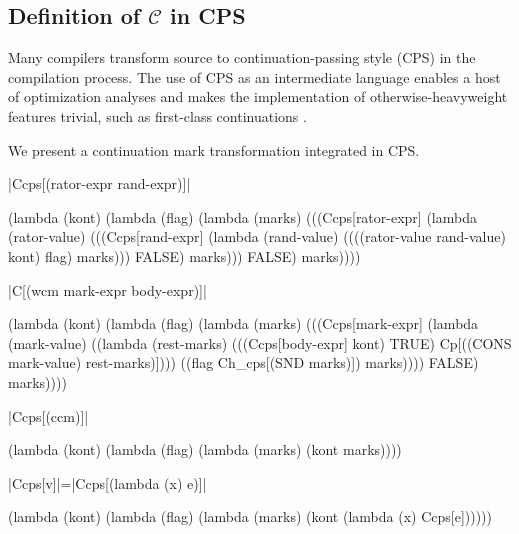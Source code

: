 \documentclass{llncs}
\begin{document}
\subsection{Definition of $\mathcal{C}$ in CPS}

Many compilers transform source to continuation-passing style (CPS) in the compilation process. The use of CPS as an intermediate language enables a host of optimization analyses and makes the implementation of otherwise-heavyweight features trivial, such as first-class continuations \cite{appel2007compiling}.

We present a continuation mark transformation integrated in CPS.

\begin{schemedefn}{\scheme|Ccps[(rator-expr rand-expr)]|}
\begin{schemedisplay}
(lambda (kont)
   (lambda (flag)
     (lambda (marks)
       (((Ccps[rator-expr]
          (lambda (rator-value)
            (((Ccps[rand-expr]
               (lambda (rand-value)
                 ((((rator-value rand-value) kont) flag) marks)))
              FALSE)
             marks)))
         FALSE)
        marks))))
\end{schemedisplay}
\end{schemedefn}

\begin{schemedefn}{\scheme|C[(wcm mark-expr body-expr)]|}
\begin{schemedisplay}
(lambda (kont)
  (lambda (flag)
    (lambda (marks)
      (((Ccps[mark-expr]
          (lambda (mark-value) 
            ((lambda (rest-marks) 
               (((Ccps[body-expr] kont) TRUE) Cp[((CONS mark-value) rest-marks)])))
             ((flag Ch_cps[(SND marks)]) marks))))
        FALSE)
       marks))))
\end{schemedisplay}
\end{schemedefn}

\begin{schemedefn}{\scheme|Ccps[(ccm)]|}
\begin{schemedisplay}
(lambda (kont)
  (lambda (flag)
    (lambda (marks)
      (kont marks))))
\end{schemedisplay}
\end{schemedefn}

\begin{schemedefn}{\scheme|Ccps[v]|=\scheme|Ccps[(lambda (x) e)]|}
\begin{schemedisplay}
(lambda (kont)
  (lambda (flag)
    (lambda (marks)
      (kont (lambda (x) Ccps[e])))))
\end{schemedisplay}
\end{schemedefn}
\end{document}
